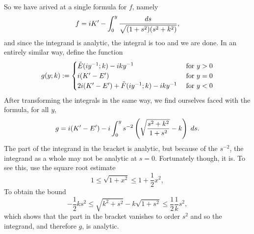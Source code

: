 So we have arived at a single formula for $f$, namely
\[
f = i K' - \int_0^y \frac{ds}{\sqrt{(1+s^2)(s^2+k^2)}},
\]
and since the integrand is analytic, the integral is too and we are done. In an entirely similar way, define the function
\[
g(y;k) :=
\begin{cases}
\tilde E(i y^{-1}; k) - i ky^{-1}             & \text{ for } y > 0 \\
i (K'-E')                                       & \text{ for } y = 0 \\
2i (K'-E') + \tilde F(i y^{-1}; k)  - i ky^{-1}  & \text{ for } y < 0
\end{cases}
\]
After transforming the integrals in the same way, we find ourselves faced with the formula, for all $y$,
\[
g = i (K'-E') - i \int_0^y s^{-2}\left( \sqrt{\frac{s^2 + k^2}{1 + s^2}} - k \right)\;ds.
\]
The part of the integrand in the bracket is analytic, but because of the $s^{-2}$, the integrand as a whole may not be analytic at $s=0$. Fortunately though, it is. To see this, use the square root estimate
\[
1 \leq \sqrt {1 + x^2} \leq 1 + \frac{1}{2}x^2,
\]
To obtain the bound
\[
-\frac{1}{2}k s^2 \leq \sqrt{k^2 + s^2} - k \sqrt{1+s^2} \leq \frac{1}{2}\frac{1}{k} s^2,
\]
which shows that the part in the bracket vanishes to order $s^2$ and so the integrand, and therefore $g$, is analytic.

